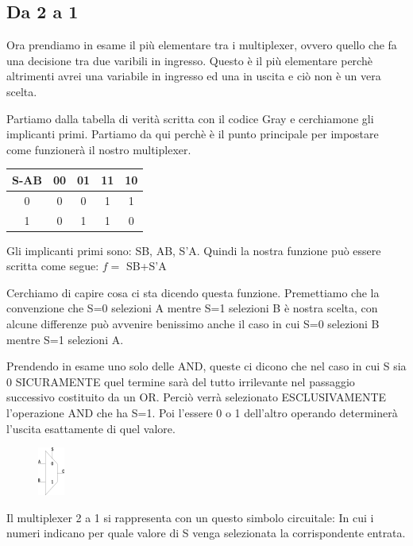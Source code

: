 \documentclass[a4paper]{book}
\begin{document}
\subsection{Da 2 a 1}
Ora prendiamo in esame il più elementare tra i multiplexer, ovvero quello che fa una decisione tra due varibili in ingresso.
Questo è il più elementare perchè altrimenti avrei una variabile in ingresso ed una in uscita e ciò non è un vera scelta.

Partiamo dalla tabella di verità scritta con il codice Gray e cerchiamone gli implicanti primi.
Partiamo da qui perchè è il punto principale per impostare come funzionerà il nostro multiplexer.\\

\begin{tabular}{|c|c|c|c|c|}
\hline
S-AB & 00 & 01 & 11 & 10 \\ \hline
0 &    0  &  0 & \cellcolor{yellow}1  & \cellcolor{yellow}1  \\ \hline  
1 &    0  &  \cellcolor{yellow}1 & \cellcolor{yellow}1  & 0  \\
\hline
\end{tabular}\break


Gli implicanti primi sono: SB, AB, S'A.
Quindi la nostra funzione può essere scritta come segue:
\( f=\) SB+S'A

Cerchiamo di capire cosa ci sta dicendo questa funzione.
Premettiamo che la convenzione che S=0 selezioni A mentre S=1 selezioni B è nostra scelta, con alcune differenze può avvenire benissimo anche il caso in cui S=0 selezioni B mentre S=1 selezioni A.

Prendendo in esame uno solo delle AND, queste ci dicono che nel caso in cui S sia 0 SICURAMENTE quel termine sarà del tutto irrilevante nel passaggio successivo costituito da un OR.
Perciò verrà selezionato ESCLUSIVAMENTE l'operazione AND che ha S=1.
Poi l'essere 0 o 1 dell'altro operando determinerà l'uscita esattamente di quel valore.



\begin{figure}
\includegraphics{Multiplexer21}
\end{figure}


Il multiplexer 2 a 1 si rappresenta con un questo simbolo circuitale:
In cui i numeri indicano per quale valore di S venga selezionata la corrispondente entrata.
\end{document}
